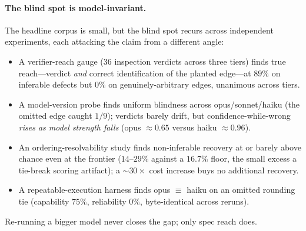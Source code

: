 \documentclass[11pt]{article}
\begin{document}
\paragraph{The blind spot is model-invariant.}
The headline corpus is small, but the blind spot recurs across independent experiments, each attacking
the claim from a different angle:
\begin{itemize}[leftmargin=1.4em,itemsep=1pt]
\item A verifier-reach gauge (36 inspection verdicts across three tiers) finds true reach---verdict
\emph{and} correct identification of the planted edge---at $89\%$ on inferable defects but $0\%$ on
genuinely-arbitrary edges, unanimous across tiers.
\item A model-version probe finds uniform blindness across opus/sonnet/haiku (the omitted edge caught
$1/9$); verdicts barely drift, but confidence-while-wrong \emph{rises as model strength falls}
(opus $\approx\!0.65$ versus haiku $\approx\!0.96$).
\item An ordering-resolvability study finds non-inferable recovery at or barely above chance even at
the frontier ($14$--$29\%$ against a $16.7\%$ floor, the small excess a tie-break scoring artifact);
a $\sim\!30\times$ cost increase buys no additional recovery.
\item A repeatable-execution harness finds opus $\equiv$ haiku on an omitted rounding tie (capability
$75\%$, reliability $0\%$, byte-identical across reruns).
\end{itemize}
Re-running a bigger model never closes the gap; only spec reach does.
\end{document}
